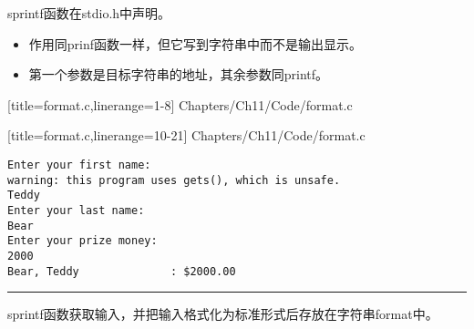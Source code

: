 \begin{frame}[fragile]
sprintf函数在stdio.h中声明。 \vspace{.05in}

\begin{itemize}
\item 
作用同prinf函数一样，但它写到字符串中而不是输出显示。 \\[0.1in]
\item
第一个参数是目标字符串的地址，其余参数同printf。
\end{itemize}
\end{frame}


\begin{frame}[fragile]

[title=format.c,linerange={1-8}]
{Chapters/Ch11/Code/format.c}
\end{frame}

\begin{frame}[fragile]

[title=format.c,linerange={10-21}]
{Chapters/Ch11/Code/format.c}
\end{frame}

\begin{frame}[fragile]
\begin{lstlisting}[basicstyle=\ttfamily]
Enter your first name:
warning: this program uses gets(), which is unsafe.
Teddy
Enter your last name:
Bear
Enter your prize money:
2000
Bear, Teddy              : $2000.00

\end{lstlisting}

\pause \rule{\textwidth}{0.3mm}\vspace{0.3mm}

sprintf函数获取输入，并把输入格式化为标准形式后存放在字符串format中。

\end{frame}